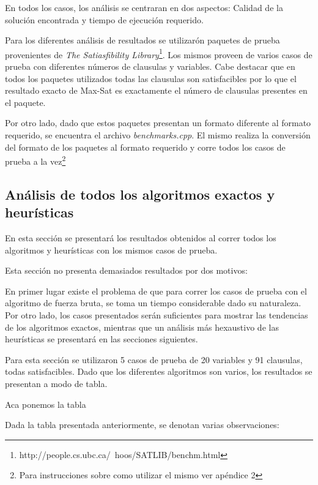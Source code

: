\documentclass[a4paper,10pt]{article}
\begin{document}
En todos los casos, los an\'alisis se centraran en dos aspectos: Calidad de la soluci\'on encontrada y tiempo de ejecuci\'on requerido.

Para los diferentes an\'alisis de resultados se utilizar\'on paquetes de prueba provenientes de \emph{The Satiasfibility Library}\footnote{http://people.cs.ubc.ca/~hoos/SATLIB/benchm.html}. Los mismos proveen de varios casos de prueba con diferentes n\'umeros de clausulas y variables. Cabe destacar que en todos los paquetes utilizados todas las clausulas son satisfacibles por lo que el resultado exacto de Max-Sat es exactamente el n\'umero de clausulas presentes en el paquete.

Por otro lado, dado que estos paquetes presentan un formato diferente al formato requerido, se encuentra el archivo \emph{benchmarks.cpp}. El mismo realiza la conversi\'on del formato de los paquetes al formato requerido y corre todos los casos de prueba a la vez\footnote{Para instrucciones sobre como utilizar el mismo ver ap\'endice 2}

\subsection*{An\'alisis de todos los algoritmos exactos y heur\'isticas}

En esta secci\'on se presentar\'a los resultados obtenidos al correr todos los algoritmos y heur\'isticas con los mismos casos de prueba. 

Esta secci\'on no presenta demasiados resultados por dos motivos:

En primer lugar existe el problema de que para correr los casos de prueba con el algoritmo de fuerza bruta, se toma un tiempo considerable dado su naturaleza. Por otro lado, los casos presentados ser\'an suficientes para mostrar las tendencias de los algoritmos exactos, mientras que un an\'alisis m\'as hexaustivo de las heur\'isticas se presentar\'a en las secciones siguientes.

\medskip

Para esta secci\'on se utilizaron 5 casos de prueba de 20 variables y 91 clausulas, todas satisfacibles. Dado que los diferentes algoritmos son varios, los resultados se presentan a modo de tabla.


Aca ponemos la tabla


Dada la tabla presentada anteriormente, se denotan varias observaciones:
\end{document}
